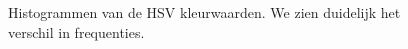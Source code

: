 \documentclass[a4paper,kulak]{kulakarticle}
\begin{document}
\begin{figure}[H]
	\centering
	\qquad
	\qquad
	
	\caption{Histogrammen van de HSV kleurwaarden. We zien duidelijk het verschil in frequenties.}
	\label{figuur HSVHIST}
\end{figure}
\end{document}

